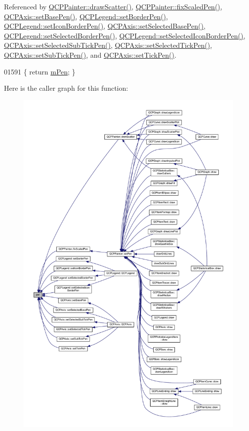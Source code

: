 Referenced by \hyperlink{a00115_source_l13300}{Q\+C\+P\+Painter\+::draw\+Scatter()}, \hyperlink{a00115_source_l13284}{Q\+C\+P\+Painter\+::fix\+Scaled\+Pen()}, \hyperlink{a00115_source_l04233}{Q\+C\+P\+Axis\+::set\+Base\+Pen()}, \hyperlink{a00115_source_l02627}{Q\+C\+P\+Legend\+::set\+Border\+Pen()}, \hyperlink{a00115_source_l02897}{Q\+C\+P\+Legend\+::set\+Icon\+Border\+Pen()}, \hyperlink{a00115_source_l04387}{Q\+C\+P\+Axis\+::set\+Selected\+Base\+Pen()}, \hyperlink{a00115_source_l02962}{Q\+C\+P\+Legend\+::set\+Selected\+Border\+Pen()}, \hyperlink{a00115_source_l02972}{Q\+C\+P\+Legend\+::set\+Selected\+Icon\+Border\+Pen()}, \hyperlink{a00115_source_l04407}{Q\+C\+P\+Axis\+::set\+Selected\+Sub\+Tick\+Pen()}, \hyperlink{a00115_source_l04397}{Q\+C\+P\+Axis\+::set\+Selected\+Tick\+Pen()}, \hyperlink{a00115_source_l04282}{Q\+C\+P\+Axis\+::set\+Sub\+Tick\+Pen()}, and \hyperlink{a00115_source_l04273}{Q\+C\+P\+Axis\+::set\+Tick\+Pen()}.


\begin{DoxyCode}
01591 \{ \textcolor{keywordflow}{return} \hyperlink{a00116_abcb7df1a54826856cb8f0e0ef696873b}{mPen}; \}
\end{DoxyCode}


Here is the caller graph for this function\+:
\nopagebreak
\begin{figure}[H]
\begin{center}
\leavevmode
\includegraphics[width=350pt]{d4/d3e/a00116_a1f13fffa0a0faac34ec342973e613a4a_icgraph}
\end{center}
\end{figure}


